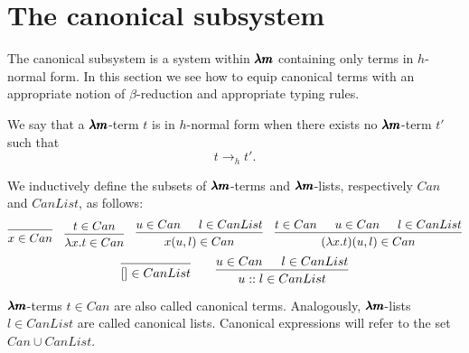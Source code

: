 
\section{The canonical subsystem}

The canonical subsystem is a system within $\pmb{\lambda m}$ containing only terms in $h$-normal form.
In this section we see how to equip canonical terms with an appropriate notion of $\beta$-reduction and appropriate typing rules.

\begin{definition}
  We say that a $\pmb{\lambda m}$-term $t$ is in $h$-normal form when there exists no $\pmb{\lambda m}$-term $t'$ such that \[ t \to_h t' . \]
\end{definition}

\begin{definition}
  \label{canonical_terms}
  We inductively define the subsets of $\pmb{\lambda m}$-terms and $\pmb{\lambda m}$-lists, respectively $Can$ and $CanList$, as follows:
  \[
    \begin{prooftree}
      \infer0{ x \in Can } 
    \end{prooftree}
    \quad
    \begin{prooftree}
      \hypo{ t \in Can }
      \infer1{ \lambda x . t \in Can } 
    \end{prooftree}
    \quad
    \begin{prooftree}
      \hypo{ u \in Can }            
      \hypo{ l \in CanList }
      \infer2{ x(u, l) \in Can }
    \end{prooftree}
    \quad
    \begin{prooftree}
      \hypo{ t \in Can } 
      \hypo{ u \in Can }            
      \hypo{ l \in CanList }
      \infer3{ (\lambda x. t)(u, l) \in Can }
    \end{prooftree}
  \]
  \[
    \begin{prooftree}
      \infer0{ [] \in CanList } 
    \end{prooftree}
    \qquad
    \begin{prooftree}
      \hypo{ u \in Can }            
      \hypo{ l \in CanList }
      \infer2{ u::l \in CanList }
    \end{prooftree}
  \]

  $\pmb{\lambda m}$-terms $t \in Can$ are also called canonical terms.
  Analogously, $\pmb{\lambda m}$-lists $l \in CanList$ are called canonical lists.
  Canonical expressions will refer to the set $Can \cup CanList$.
\end{definition}

